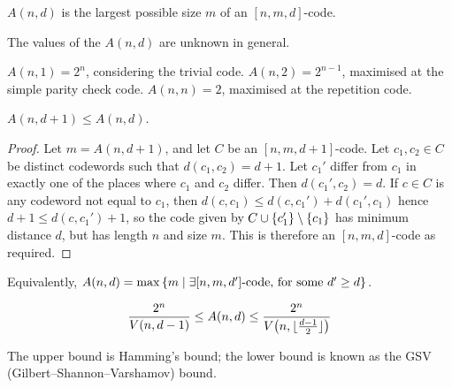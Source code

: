 \begin{definition}
    \( A(n,d) \) is the largest possible size \( m \) of an \( [n,m,d] \)-code.
\end{definition}
The values of the \( A(n,d) \) are unknown in general.
\begin{example}
    \( A(n,1) = 2^n \), considering the trivial code.
    \( A(n,2) = 2^{n-1} \), maximised at the simple parity check code.
    \( A(n,n) = 2 \), maximised at the repetition code.
\end{example}
\begin{lemma}
    \( A(n,d+1) \leq A(n,d) \).
\end{lemma}
\begin{proof}
    Let \( m = A(n,d+1) \), and let \( C \) be an \( [n,m,d+1] \)-code.
    Let \( c_1, c_2 \in C \) be distinct codewords such that \( d(c_1,c_2) = d+1 \).
    Let \( c_1' \) differ from \( c_1 \) in exactly one of the places where \( c_1 \) and \( c_2 \) differ.
    Then \( d(c_1', c_2) = d \).
    If \( c \in C \) is any codeword not equal to \( c_1 \), then \( d(c,c_1) \leq d(c,c_1') + d(c_1',c_1) \) hence \( d + 1 \leq d(c,c_1') + 1 \), so the code given by \( C \cup \qty{c_1'} \setminus \qty{c_1} \) has minimum distance \( d \), but has length \( n \) and size \( m \).
    This is therefore an \( [n,m,d] \)-code as required.
\end{proof}
\begin{corollary}
    Equivalently, \( A(n,d) = \max \qty{m \mid \exists [n,m,d'] \text{-code, for some } d' \geq d} \).
\end{corollary}
\begin{theorem}
    \[ \frac{2^n}{V(n,d-1)} \leq A(n,d) \leq \frac{2^n}{V\qty(n,\lfloor\frac{d-1}{2}\rfloor)} \]
\end{theorem}
The upper bound is Hamming's bound; the lower bound is known as the GSV (Gilbert--Shannon--Varshamov) bound.

